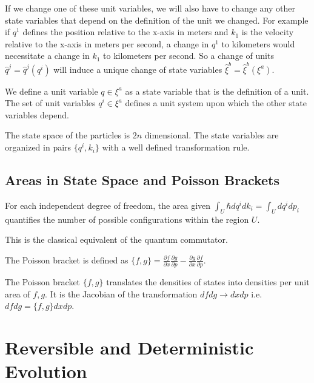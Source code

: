 \documentclass{article}
\begin{document}
If we change one of these unit variables, we will also have to change any other state variables that depend on the definition of the unit we changed. For example if $q^1$ defines the position relative to the x-axis in meters and $k_1$ is the velocity relative to the x-axis in meters per second, a change in $q^1$ to kilometers would necessitate a change in $k_1$ to kilometers per second. So a change of units $\hat{q}^j = \hat{q}^j(q^i)$ will induce a unique change of state variables $\hat{\xi}^b = \hat{\xi}^b(\xi^a)$.

\begin{defn}
	We define a unit variable $q \in \xi^a$ as a state variable that is the definition of a unit. The set of unit variables $q^i \in \xi^a$ defines a unit system upon which the other state variables depend.
\end{defn}



\begin{prop}
	The state space of the particles is $2n$ dimensional. The state variables are organized in pairs $\{q^i, k_i\}$ with a well defined transformation rule.
\end{prop}

\subsection{Areas in State Space and Poisson Brackets}
	
\begin{prop}
	For each independent degree of freedom, the area given $\int_U \hbar dq^i dk_i = \int_U dq^i dp_i$ quantifies the number of possible configurations within the region $U$.
\end{prop}

 This is the classical equivalent of the quantum commutator.

\begin{defn}
	The Poisson bracket is defined as $\{f,g\} = \frac{\partial f}{\partial x}\frac{\partial g}{\partial p} - \frac{\partial g}{\partial x}\frac{\partial f}{\partial p}$.
\end{defn}

\begin{prop}
	The Poisson bracket $\{f, g\}$ translates the densities of states into densities per unit area of $f, g$. It is the Jacobian of the transformation $dfdg \rightarrow dxdp$ i.e. $dfdg = \{f,g\}dxdp$.
\end{prop}
	
\section{Reversible and Deterministic Evolution}
\end{document}
